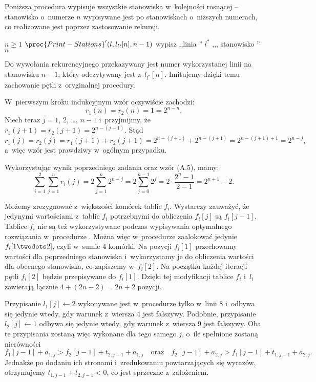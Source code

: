 
\exercise %
Poniższa procedura wypisuje wszystkie stanowiska w~kolejności rosnącej -- stanowisko o~numerze $n$ wypisywane jest po stanowiskach o~niższych numerach, co realizowane jest poprzez zastosowanie rekursji.
\begin{codebox}
\li	\If $n\ge1$
\li	\Then $\proc{Print-Stations}'(l,l_{l^*\!}[n],n-1)$
\li		wypisz ,,linia '' $l^*\!$ ,,{}, stanowisko '' $n$
	\End
\end{codebox}
Do wywołania rekurencyjnego przekazywany jest numer wykorzystanej linii na stanowisku $n-1$, który odczytywany jest z~$l_{l^*\!}[n]$.
Imitujemy dzięki temu zachowanie pętli z~oryginalnej procedury.

\exercise %
W~pierwszym kroku indukcyjnym wzór oczywiście zachodzi:
\[
	r_1(n) = r_2(n) = 1 = 2^{n-n}.
\]
Niech teraz $j=1$, 2, \dots, $n-1$ i~przyjmijmy, że $r_1(j+1)=r_2(j+1)=2^{n-(j+1)}$.
Stąd
\[
	r_1(j) = r_2(j) = r_1(j+1)+r_2(j+1) = 2^{n-(j+1)}+2^{n-(j+1)} = 2^{n-(j+1)+1} = 2^{n-j},
\]
a~więc wzór jest prawdziwy w~ogólnym przypadku.

\exercise %
Wykorzystując wynik poprzedniego zadania oraz wzór (A.5), mamy:
\[
	\sum_{i=1}^2\sum_{j=1}^nr_i(j) = 2\sum_{j=1}^n2^{n-j} = 2\sum_{j=0}^{n-1}2^j = 2\cdot\frac{2^n-1}{2-1} = 2^{n+1}-2.
\]

\exercise %
Możemy zrezygnować z~większości komórek tablic $f_i$.
Wystarczy zauważyć, że jedynymi wartościami z~tablic $f_i$ potrzebnymi do obliczenia $f_i[j]$ są $f_i[j-1]$.
Tablice $f_i$ nie są też wykorzystywane podczas wypisywania optymalnego rozwiązania w~procedurze .
Można więc w~procedurze  zaalokować jedynie $f_i[1\twodots2]$, czyli w~sumie 4 komórki.
Na pozycji $f_i[1]$ przechowamy wartości dla poprzedniego stanowiska i~wykorzystamy je do obliczenia wartości dla obecnego stanowiska, co zapiszemy w~$f_i[2]$.
Na początku każdej iteracji pętli  $f_i[2]$ będzie przepisywane do $f_i[1]$.
Dzięki tej modyfikacji tablice $f_i$ i~$l_i$ zawierają łącznie $4+(2n-2)=2n+2$ pozycji.

\exercise %
Przypisanie $l_1[j]\gets2$ wykonywane jest w~procedurze  tylko w~linii 8 i~odbywa się jedynie wtedy, gdy warunek z~wiersza 4 jest fałszywy.
Podobnie, przypisanie $l_2[j]\gets1$ odbywa się jedynie wtedy, gdy warunek z~wiersza 9 jest fałszywy.
Oba te przypisania zostaną więc wykonane dla tego samego $j$, o~ile spełnione zostaną nierówności
\[
	f_1[j-1]+a_{1,j}>f_2[j-1]+t_{2,j-1}+a_{1,j} \quad\text{oraz}\quad f_2[j-1]+a_{2,j}>f_1[j-1]+t_{1,j-1}+a_{2,j}.
\]
Jednakże po dodaniu ich stronami i~zredukowaniu powtarzających się wyrazów, otrzymujemy $t_{1,j-1}+t_{2,j-1}<0$, co jest sprzeczne z~założeniem.
